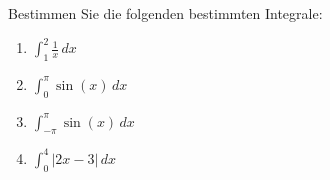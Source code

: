\begin{ExerciseBlock}
Bestimmen Sie die folgenden bestimmten Integrale:
\begin{enumerate}[label=\alph*)]
	\item $\int_1^2 \frac{1}{x} \, dx$
	\item $\int_0^{\pi} \sin(x) \, dx$
	\item $\int_{-\pi}^{\pi} \sin(x) \, dx$
	\item $\int_0^4 |2x-3| \, dx$
\end{enumerate}

\end{ExerciseBlock}
